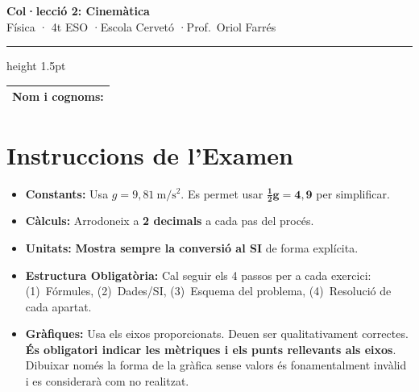 \documentclass[12pt,a4paper,twoside]{article}
\newcounter{exercici}
\begin{document}
\begin{center}
  \vspace*{-15pt}
  {\Huge\bfseries Col·lecció 2: Cinemàtica}\\[8pt]
  {\Large Física · 4t ESO \quad·\quad Escola Cervetó \quad·\quad Prof.\ Oriol Farrés}\\[12pt]
  \hrule height 1.5pt
  \vspace{5pt}
\end{center}

\noindent
\begin{tabularx}{\textwidth}{|X|}
  \hline
  \rule{0pt}{15pt}\textbf{\large Nom i cognoms:}\\[5pt]
  \hline
\end{tabularx}

\vspace{0.6cm}

\section*{Instruccions de l'Examen}

\begin{itemize}[leftmargin=1.5em, itemsep=4pt, parsep=0pt]
  \item \textbf{Constants:} Usa $g = 9{,}81\ \mathrm{m/s^2}$. Es permet usar $\mathbf{\frac{1}{2} g = 4{,}9}$ per simplificar.
  \item \textbf{Càlculs:} Arrodoneix a \textbf{2 decimals} a cada pas del procés.
  \item \textbf{Unitats:} \textbf{Mostra sempre la conversió al SI} de forma explícita.
  \item \textbf{Estructura Obligatòria:} Cal seguir els 4 passos per a cada exercici: (1)~Fórmules, (2)~Dades/SI, (3)~Esquema del problema, (4)~Resolució de cada apartat.
  \item \textbf{Gràfiques:} Usa els eixos proporcionats. Deuen ser qualitativament correctes. \textbf{És obligatori indicar les mètriques i els punts rellevants als eixos}. Dibuixar només la forma de la gràfica sense valors és fonamentalment invàlid i es considerarà com no realitzat.
\end{itemize}

\vspace{0.3cm}
\end{document}
